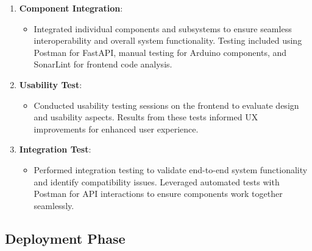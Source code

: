 \begin{enumerate}
    \item \textbf{Component Integration}:
    \begin{itemize}
        \item Integrated individual components and subsystems to ensure seamless interoperability and overall system functionality. Testing included using Postman for FastAPI, manual testing for Arduino components, and SonarLint for frontend code analysis.
    \end{itemize}

\item \textbf{Usability Test}:
    \begin{itemize}
        \item Conducted usability testing sessions on the frontend to evaluate design and usability aspects. Results from these tests informed UX improvements for enhanced user experience.
    \end{itemize}

\item \textbf{Integration Test}:
    \begin{itemize}
        \item Performed integration testing to validate end-to-end system functionality and identify compatibility issues. Leveraged automated tests with Postman for API interactions to ensure components work together seamlessly.
    \end{itemize}

\end{enumerate}



\subsection{Deployment Phase}

